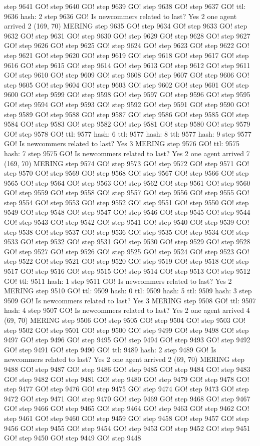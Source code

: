 step 9641 GO! step 9640 GO! step 9639 GO! step 9638 GO! step 9637 GO! ttl: 9636 hash: 2 step 9636 GO! Is newcommers related to last? Yes 2 one agent arrived 2 (169, 70) MERING step 9635 GO! step 9634 GO! step 9633 GO! step 9632 GO! step 9631 GO! step 9630 GO! step 9629 GO! step 9628 GO! step 9627 GO! step 9626 GO! step 9625 GO! step 9624 GO! step 9623 GO! step 9622 GO! step 9621 GO! step 9620 GO! step 9619 GO! step 9618 GO! step 9617 GO! step 9616 GO! step 9615 GO! step 9614 GO! step 9613 GO! step 9612 GO! step 9611 GO! step 9610 GO! step 9609 GO! step 9608 GO! step 9607 GO! step 9606 GO! step 9605 GO! step 9604 GO! step 9603 GO! step 9602 GO! step 9601 GO! step 9600 GO! step 9599 GO! step 9598 GO! step 9597 GO! step 9596 GO! step 9595 GO! step 9594 GO! step 9593 GO! step 9592 GO! step 9591 GO! step 9590 GO! step 9589 GO! step 9588 GO! step 9587 GO! step 9586 GO! step 9585 GO! step 9584 GO! step 9583 GO! step 9582 GO! step 9581 GO! step 9580 GO! step 9579 GO! step 9578 GO! ttl: 9577 hash: 6 ttl: 9577 hash: 8 ttl: 9577 hash: 9 step 9577 GO! Is newcommers related to last? Yes 3 MERING step 9576 GO! ttl: 9575 hash: 7 step 9575 GO! Is newcommers related to last? Yes 2 one agent arrived 7 (169, 70) MERING step 9574 GO! step 9573 GO! step 9572 GO! step 9571 GO! step 9570 GO! step 9569 GO! step 9568 GO! step 9567 GO! step 9566 GO! step 9565 GO! step 9564 GO! step 9563 GO! step 9562 GO! step 9561 GO! step 9560 GO! step 9559 GO! step 9558 GO! step 9557 GO! step 9556 GO! step 9555 GO! step 9554 GO! step 9553 GO! step 9552 GO! step 9551 GO! step 9550 GO! step 9549 GO! step 9548 GO! step 9547 GO! step 9546 GO! step 9545 GO! step 9544 GO! step 9543 GO! step 9542 GO! step 9541 GO! step 9540 GO! step 9539 GO! step 9538 GO! step 9537 GO! step 9536 GO! step 9535 GO! step 9534 GO! step 9533 GO! step 9532 GO! step 9531 GO! step 9530 GO! step 9529 GO! step 9528 GO! step 9527 GO! step 9526 GO! step 9525 GO! step 9524 GO! step 9523 GO! step 9522 GO! step 9521 GO! step 9520 GO! step 9519 GO! step 9518 GO! step 9517 GO! step 9516 GO! step 9515 GO! step 9514 GO! step 9513 GO! step 9512 GO! ttl: 9511 hash: 1 step 9511 GO! Is newcommers related to last? Yes 2 MERING step 9510 GO! ttl: 9509 hash: 0 ttl: 9509 hash: 5 ttl: 9509 hash: 3 step 9509 GO! Is newcommers related to last? Yes 3 MERING step 9508 GO! ttl: 9507 hash: 4 step 9507 GO! Is newcommers related to last? Yes 2 one agent arrived 4 (69, 70) MERING step 9506 GO! step 9505 GO! step 9504 GO! step 9503 GO! step 9502 GO! step 9501 GO! step 9500 GO! step 9499 GO! step 9498 GO! step 9497 GO! step 9496 GO! step 9495 GO! step 9494 GO! step 9493 GO! step 9492 GO! step 9491 GO! step 9490 GO! ttl: 9489 hash: 2 step 9489 GO! Is newcommers related to last? Yes 2 one agent arrived 2 (69, 70) MERING step 9488 GO! step 9487 GO! step 9486 GO! step 9485 GO! step 9484 GO! step 9483 GO! step 9482 GO! step 9481 GO! step 9480 GO! step 9479 GO! step 9478 GO! step 9477 GO! step 9476 GO! step 9475 GO! step 9474 GO! step 9473 GO! step 9472 GO! step 9471 GO! step 9470 GO! step 9469 GO! step 9468 GO! step 9467 GO! step 9466 GO! step 9465 GO! step 9464 GO! step 9463 GO! step 9462 GO! step 9461 GO! step 9460 GO! step 9459 GO! step 9458 GO! step 9457 GO! step 9456 GO! step 9455 GO! step 9454 GO! step 9453 GO! step 9452 GO! step 9451 GO! step 9450 GO! step 9449 GO! step 9448 